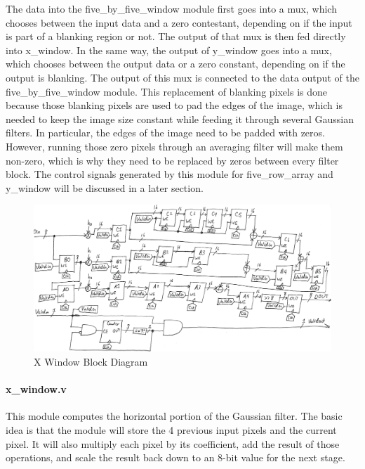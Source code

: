 The data into the five\_by\_five\_window module first goes into a mux, which 
chooses between the input data and a zero contestant, depending on if the input 
is part of a blanking region or not. The output of that mux is then fed directly 
into x\_window. In the same way, the output of y\_window goes into a mux, which 
chooses between the output data or a zero constant, depending on if the output 
is blanking. The output of this mux is connected to the data output of the 
five\_by\_five\_window module. This replacement of blanking pixels is done because 
those blanking pixels are used to pad the edges of the image, which is needed to 
keep the image size constant while feeding it through several Gaussian filters. 
In particular, the edges of the image need to be padded with zeros. However, 
running those zero pixels through an averaging filter will make them non-zero, 
which is why they need to be replaced by zeros between every filter block.
The control signals generated by this module for five\_row\_array and y\_window 
will be discussed in a later section.

\begin{figure}
    \centering
    \includegraphics[width=\textwidth]{processed_image_pngs/x_window.png}
    \caption{X Window Block Diagram}
    \label{fig:x_window}
\end{figure}

\paragraph{x\_window.v}

This module computes the horizontal portion of the Gaussian filter. The basic 
idea is that the module will store the 4 previous input pixels and the current 
pixel. It will also multiply each pixel by its coefficient, add the result of 
those operations, and scale the result back down to an 8-bit value for the next 
stage.

